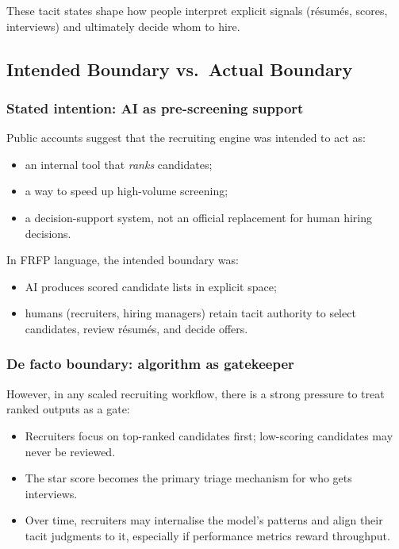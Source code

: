 These tacit states shape how people interpret explicit signals (résumés,
scores, interviews) and ultimately decide whom to hire.

\subsection{Intended Boundary vs.\ Actual Boundary}

\subsubsection*{Stated intention: AI as pre-screening support}

Public accounts suggest that the recruiting engine was intended to act as:

\begin{itemize}
  \item an internal tool that \emph{ranks} candidates;
  \item a way to speed up high-volume screening;
  \item a decision-support system, not an official replacement for human
        hiring decisions.
\end{itemize}

In FRFP language, the intended boundary was:

\begin{itemize}
  \item AI produces scored candidate lists in explicit space;
  \item humans (recruiters, hiring managers) retain tacit authority to
        select candidates, review résumés, and decide offers.
\end{itemize}

\subsubsection*{De facto boundary: algorithm as gatekeeper}

However, in any scaled recruiting workflow, there is a strong pressure to
treat ranked outputs as a gate:

\begin{itemize}
  \item Recruiters focus on top-ranked candidates first; low-scoring
        candidates may never be reviewed.
  \item The star score becomes the primary triage mechanism for who gets
        interviews.
  \item Over time, recruiters may internalise the model’s patterns and
        align their tacit judgments to it, especially if performance metrics
        reward throughput.
\end{itemize}

